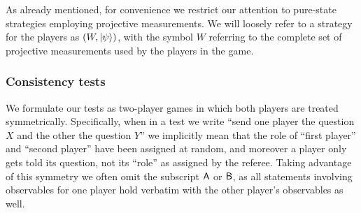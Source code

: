 As already mentioned, for convenience we restrict our attention to pure-state strategies employing projective measurements. 
We will loosely refer to a strategy for the players as $(W,|\psi\rangle)$, with the symbol $W$ referring to the complete set of projective measurements used by the players in the game.

\subsubsection{Consistency tests}
\label{sec:cons-test}

We formulate our tests as two-player games in which both players are treated symmetrically. Specifically, when in a test we write ``send one player the question $X$ and the other the question $Y$'' we implicitly mean that the role of ``first player'' and ``second player'' have been assigned at random, and moreover a player only gets told its question, not its ``role'' as assigned by the referee. 
 Taking advantage of this symmetry we often omit the subscript ${\textsf{A}}$ or ${\textsf{B}}$, as all statements involving observables for one player hold verbatim with the other player's observables as well. 

